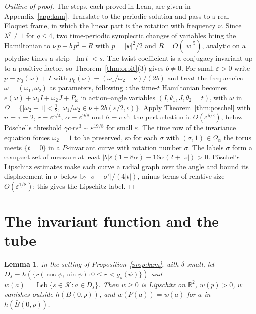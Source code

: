 \documentclass[11pt]{article}
\newtheorem{lemma}[theorem]{Lemma}
\theoremstyle{definition}
\theoremstyle{remark}
\newcommand{\R}{\mathbb{R}}
\newcommand{\Leb}{\operatorname{Leb}}
\begin{document}
\begin{proof}[Outline of proof]
The steps, each proved in Lean, are given in Appendix~\ref{app:kam}. Translate
to the periodic solution and pass to a real Floquet frame, in which the linear
part is the rotation with frequency $\nu$. Since $\lambda^q\ne1$ for $q\le4$, two
time-periodic symplectic changes of variables bring the Hamiltonian to
$\nu\,p+b\,p^2+R$ with $p=|w|^2/2$ and $R=O(|w|^5)$, analytic on a polydisc
times a strip $|\operatorname{Im}t|<s$. The twist coefficient is a
conjugacy invariant up to a positive factor, so Theorem~\ref{thm:orbit}(3)
gives $b\ne0$. For small $\varepsilon>0$ write
$p=p_0(\omega)+I$ with $p_0(\omega)=(\omega_1/\omega_2-\nu)/(2b)$ and treat
the frequencies $\omega=(\omega_1,\omega_2)$ as parameters, following
\cite[\S2a]{P}: the time-$t$ Hamiltonian becomes
$e(\omega)+\omega_1I+\omega_2J+P_\omega$ in action--angle variables
$(I,\theta_1,J,\theta_2=t)$, with $\omega$ in
$\Omega=\{|\omega_2-1|<\tfrac12,\ \omega_1/\omega_2\in\nu+2b(\varepsilon/2,\varepsilon)\}$.
Apply Theorem~\ref{thm:poschel} with $n=\tau=2$, $r=\varepsilon^{5/4}$,
$\alpha=\varepsilon^{9/8}$ and $h=\alpha s^3$: the perturbation is
$O(\varepsilon^{5/2})$, below Pöschel's threshold
$\gamma\alpha rs^3\sim\varepsilon^{19/8}$ for small $\varepsilon$. The time
row of the invariance equation forces $\omega_2=1$ to be preserved, so for
each $\sigma$ with $(\sigma,1)\in\Omega_\alpha$ the torus meets $\{t=0\}$ in
a $P$-invariant curve with rotation number $\sigma$. The labels $\sigma$ form
a compact set of measure at least
$|b|\varepsilon(1-8\alpha)-16\alpha(2+|\nu|)>0$. Pöschel's Lipschitz estimates
make each curve a radial graph over the angle and bound its displacement in
$\sigma$ below by $|\sigma-\sigma'|/(4|b|)$, minus terms of relative size
$O(\varepsilon^{1/8})$; this gives the Lipschitz label.
\end{proof}

\section{The invariant function and the tube}\label{sec:tube}
\begin{lemma}\label{lem:w}
In the setting of Proposition~\ref{prop:kam}, with $\delta$ small, let
$D_s=h(\{r(\cos\psi,\sin\psi):0\le r<g_s(\psi)\})$ and
$w(a)=\Leb\{s\in\mathcal K:a\in D_s\}$. Then $w\ge0$ is Lipschitz on $\R^2$,
$w(p)>0$, $w$ vanishes outside $h(B(0,\rho))$, and $w(P(a))=w(a)$ for $a$ in
$h(\bar B(0,\rho))$.
\end{lemma}
\end{document}
